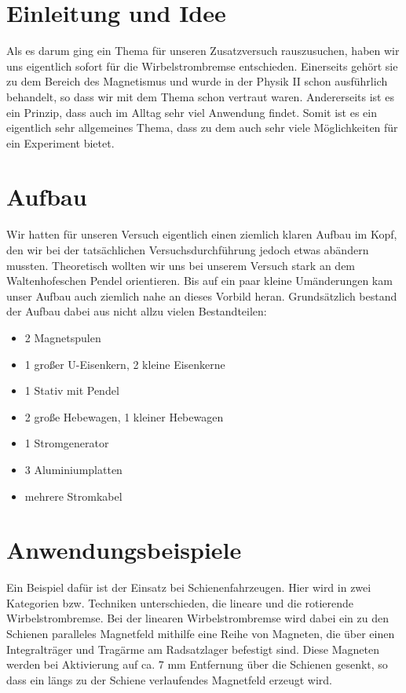 



\section{Einleitung und Idee}

Als es darum ging ein Thema für unseren Zusatzversuch rauszusuchen, haben wir uns
eigentlich sofort für die Wirbelstrombremse entschieden. Einerseits gehört sie zu
dem Bereich des Magnetismus und wurde in der Physik II schon ausführlich behandelt,
so dass wir mit dem Thema schon vertraut waren. Andererseits ist es ein Prinzip,
dass auch im Alltag sehr viel Anwendung findet. Somit ist es ein eigentlich sehr
allgemeines Thema, dass zu dem auch sehr viele Möglichkeiten für ein Experiment
bietet.

\section{Aufbau}

Wir hatten für unseren Versuch eigentlich einen ziemlich klaren Aufbau im Kopf,
den wir bei der tatsächlichen Versuchsdurchführung jedoch etwas abändern mussten.
Theoretisch wollten wir uns bei unserem Versuch stark an dem Waltenhofeschen Pendel
orientieren. Bis auf ein paar kleine Umänderungen kam unser Aufbau auch ziemlich
nahe an dieses Vorbild heran. Grundsätzlich bestand der Aufbau dabei aus nicht
allzu vielen Bestandteilen:

\begin{itemize}
  \item 2 Magnetspulen
  \item 1 großer U-Eisenkern, 2 kleine Eisenkerne
  \item 1 Stativ mit Pendel
  \item 2 große Hebewagen, 1 kleiner Hebewagen
  \item 1 Stromgenerator
  \item 3 Aluminiumplatten
  \item mehrere Stromkabel
\end{itemize}



\section{Anwendungsbeispiele}

Ein Beispiel dafür ist der Einsatz bei Schienenfahrzeugen. Hier wird in zwei
Kategorien bzw. Techniken unterschieden, die lineare und die rotierende Wirbelstrombremse.
Bei der linearen Wirbelstrombremse wird dabei ein zu den Schienen paralleles
Magnetfeld mithilfe eine Reihe von Magneten, die über einen Integralträger und
Tragärme am Radsatzlager befestigt sind. Diese Magneten werden bei Aktivierung
auf ca. 7 mm Entfernung über die Schienen gesenkt, so dass ein längs zu der Schiene
verlaufendes Magnetfeld erzeugt wird.

